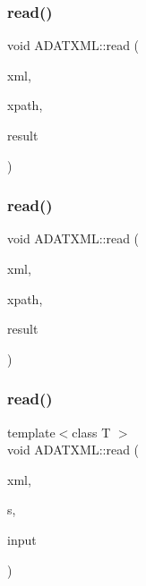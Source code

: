 \mbox{\label{group__io_ga6a4f6e0bca990676d09efaf318ed8eb7}} 
\subsubsection{\texorpdfstring{read()}{read()}\hspace{0.1cm}{\footnotesize\ttfamily [36/52]}}
{\footnotesize\ttfamily void A\+D\+A\+T\+X\+M\+L\+::read (\begin{DoxyParamCaption}\item[{\mbox{\hyperlink{classADATXML_1_1XMLReader}{X\+M\+L\+Reader}} \&}]{xml,  }\item[{const std\+::string \&}]{xpath,  }\item[{std\+::list$<$ unsigned short int $>$ \&}]{result }\end{DoxyParamCaption})}

\mbox{\label{group__io_ga3369838beeb12ff807171fc5978df1be}} 
\subsubsection{\texorpdfstring{read()}{read()}\hspace{0.1cm}{\footnotesize\ttfamily [37/52]}}
{\footnotesize\ttfamily void A\+D\+A\+T\+X\+M\+L\+::read (\begin{DoxyParamCaption}\item[{\mbox{\hyperlink{classADATXML_1_1XMLReader}{X\+M\+L\+Reader}} \&}]{xml,  }\item[{const std\+::string \&}]{xpath,  }\item[{std\+::list$<$ long int $>$ \&}]{result }\end{DoxyParamCaption})}

\mbox{\label{group__io_gacca340ef5b3a2ee3626cb544539f5e64}} 
\subsubsection{\texorpdfstring{read()}{read()}\hspace{0.1cm}{\footnotesize\ttfamily [38/52]}}
{\footnotesize\ttfamily template$<$class T $>$ \\
void A\+D\+A\+T\+X\+M\+L\+::read (\begin{DoxyParamCaption}\item[{\mbox{\hyperlink{classADATXML_1_1XMLReader}{X\+M\+L\+Reader}} \&}]{xml,  }\item[{const std\+::string \&}]{s,  }\item[{std\+::list$<$ T $>$ \&}]{input }\end{DoxyParamCaption})\hspace{0.3cm}{\ttfamily [inline]}}



